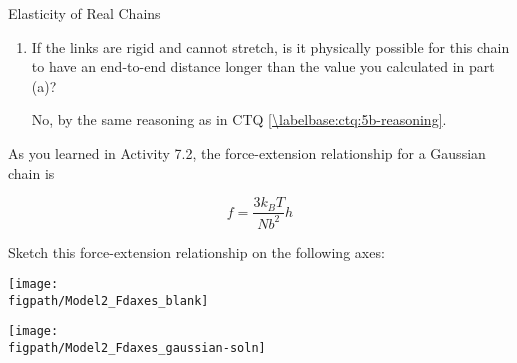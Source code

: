 \begin{activity}[extension]{Elasticity of Real Chains}
\begin{ctqs}
\begin{enumerate}
			\item If the links are rigid and cannot stretch, is it physically possible for this chain to have an end-to-end distance longer than the value you calculated in part (a)? \label{\labelbase:ctq:probgtNb}
			
				\begin{solution}[0.5in]{}
					No, by the same reasoning as in CTQ \ref{\labelbase:ctq:5b-reasoning}.
				\end{solution}
			
%			
%			
			
		\end{enumerate}
	
\end{ctqs}



\begin{infobox}
\label{\labelbase:info:gaussfd}

	As you learned in Activity 7.2, the force-extension relationship for a Gaussian chain is
	
		\begin{equation*}
			f=\frac{3k_BT}{Nb^2}h
		\end{equation*}
	
	
\end{infobox}

\begin{ctqs}

	\question Sketch this force-extension relationship on the following axes:
	
		\begin{solution}[2.25in]{\centerline{\texttt{[image: \\figpath/Model2\_Fdaxes\_blank]}}}
			\centerline{\texttt{[image: \\figpath/Model2\_Fdaxes\_gaussian-soln]}}
		\end{solution}
		

\end{ctqs}
\end{activity}

